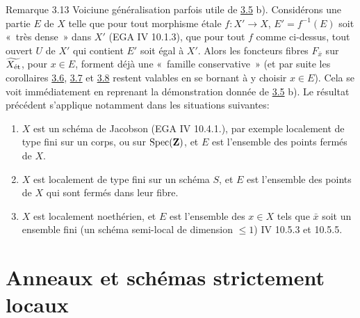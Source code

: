 \documentclass[10pt]{../fichiers-configuration-latex/smfart}
\begin{document}
\begin{enonce*}[remark]{Remarque 3.13}
Voici\pageoriginale une généralisation parfois utile
de \hyperref[VIII.thm3.5]{3.5} b). Considérons une partie $E$ de $X$ telle que
pour tout morphisme étale $f : X' \to X$, $E' = f^{-1} (E)$ soit « très dense » dans $X'$ (EGA IV 10.1.3), \ie que pour tout $f$
comme ci-dessus, tout ouvert $U$ de $X'$ qui contient $E'$ soit égal
à $X'$. Alors les foncteurs fibres $F_{\bar{x}}$ sur
$\widetilde{X_{\text{\rm ét}}}$, pour $x \in E$, forment déjà une
« famille conservative » (et par suite les corollaires
\hyperref[VIII.cor3.6]{3.6}, \hyperref[VIII.cor3.7]{3.7} et \hyperref[VIII.cor3.8]{3.8} restent
valables en se bornant à y choisir $x \in E$). Cela se voit
immédiatement en reprenant la démonstration donnée de
\hyperref[VIII.thm3.5]{3.5} b). Le résultat précédent s'applique notamment
dans les situations suivantes:
\begin{enumerate}
\renewcommand{\theenumi}{\alph{enumi}}
\renewcommand{\labelenumi}{\theenumi)}
\item $X$ est un schéma de Jacobson (EGA IV 10.4.1.), par exemple
  localement de type fini sur un corps, ou sur $\operatorname{Spec}(\mathbf{Z})$, et $E$
  est l'ensemble des points fermés de $X$.

\item $X$ est localement de type fini sur un schéma $S$, et $E$ est
  l'ensemble des points de $X$ qui sont fermés dans leur fibre.

\item $X$ est localement noethérien, et $E$ est l'ensemble des $x \in
  X$ tels que $\bar{x}$ soit un ensemble fini (\ie un schéma
  semi-local de dimension $\leq 1$) \cf \EGA IV 10.5.3 et 10.5.5.
\end{enumerate}
\end{enonce*}

\section{Anneaux et schémas strictement locaux}

\subsection{}
\end{document}
